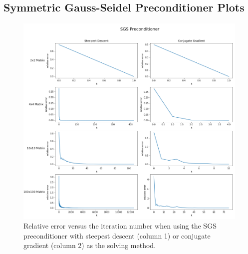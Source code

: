 \documentclass[11pt]{article}
\begin{document}
\subsection{Symmetric Gauss-Seidel Preconditioner Plots}
\begin{figure}[h!]
	\hspace*{-2cm}
	\centering
	\includegraphics[width=1.2\linewidth]{../figures/SGS Preconditioner}
	\caption{Relative error versus the iteration number when using the SGS preconditioner with steepest descent (column 1) or conjugate gradient (column 2) as the solving method.}
	\label{fig:SGS}
\end{figure}
\end{document}
